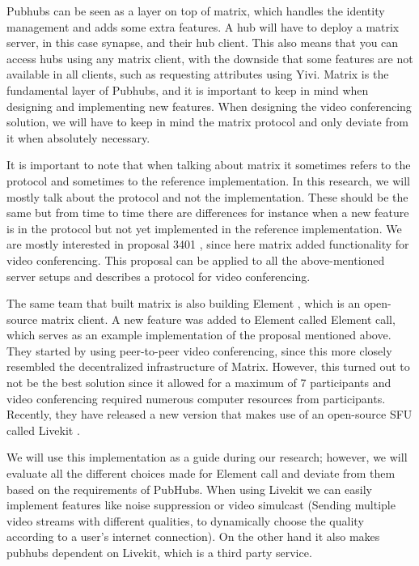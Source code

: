 \documentclass{report}
\begin{document}
Pubhubs can be seen as a layer on top of matrix, which handles the identity management and adds some extra features.
A hub will have to deploy a matrix server, in this case synapse, and their hub client. This also means that you can
access hubs using any matrix client, with the downside that some features are not available in all clients, such as
requesting attributes using Yivi. Matrix is the fundamental layer of Pubhubs, and it is important to keep in mind
when designing and implementing new features. When designing the video conferencing solution, we will have to keep
in mind the matrix protocol and only deviate from it when absolutely necessary.

It is important to note that when talking about matrix it sometimes refers to the protocol and sometimes to the
reference implementation. In this research, we will mostly talk about the protocol and not the implementation. These
should be the same but from time to time there are differences for instance when a new feature is in the protocol
but not yet implemented in the reference implementation. We are mostly interested in proposal 3401 \cite{
MATRIX_VIDEO_CALL_PROP}, since here matrix added functionality for video conferencing. This proposal
can be applied to all the above-mentioned server setups and describes a protocol for video conferencing.

The same team that built matrix is also building Element \cite{ELEMENT}, which is an open-source matrix client.
A new feature was added to Element called Element call, which serves as an example implementation of the proposal
mentioned above. They started by using peer-to-peer video conferencing, since this more closely resembled the
decentralized infrastructure of Matrix. However, this turned out to not be the best solution since it allowed for a
maximum of 7 participants and video conferencing required numerous computer  resources from participants. Recently,
they have released a new version that makes use of an open-source SFU called Livekit \cite{LIVEKIT}.

We will use this implementation as a guide during our research; however, we will evaluate all the different choices
made for Element call and deviate from them based on the requirements of PubHubs. When using Livekit we can easily
implement features like noise suppression or video simulcast (Sending multiple video streams with different
qualities, to dynamically choose the quality according to a user's internet connection). On the other hand it
also makes pubhubs dependent on Livekit, which is a third party service.
\end{document}
